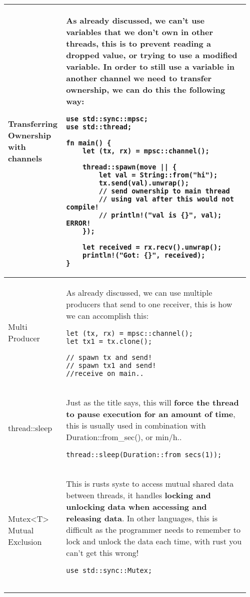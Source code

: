 \documentclass[main.tex,fontsize=8pt,paper=a4,paper=portrait,DIV=calc,]{scrartcl}
\begin{document}
\begin{table}[ht!]
\begin{tabular}{|m{0.2\linewidth}|m{0.755\linewidth}|}
\hline
Transferring Ownership with channels & 
As already discussed, we can't use variables that we don't own in other threads, this is to prevent reading a dropped value, or trying to use a modified variable.\newline
In order to still use a variable in another channel we need to \textbf{transfer ownership}, we can do this the following way:\newline
\begin{lstlisting}
use std::sync::mpsc;
use std::thread;

fn main() {
    let (tx, rx) = mpsc::channel();

    thread::spawn(move || {
        let val = String::from("hi");
        tx.send(val).unwrap();
        // send ownership to main thread
        // using val after this would not compile!
        // println!("val is {}", val); ERROR!
    });

    let received = rx.recv().unwrap();
    println!("Got: {}", received);
}
\end{lstlisting}\\
\hline
Multi Producer & 
As already discussed, we can use multiple producers that send to one receiver, this is how we can accomplish this:\newline
\begin{lstlisting}
let (tx, rx) = mpsc::channel();
let tx1 = tx.clone();

// spawn tx and send!
// spawn tx1 and send!
//receive on main..
\end{lstlisting}\\
\hline
thread::sleep & 
Just as the title says, this will \textbf{force the thread to pause execution for an amount of time},\newline
this is usually used in combination with Duration::from\_sec(), or min/h..\newline
\begin{lstlisting}
thread::sleep(Duration::from_secs(1));
\end{lstlisting}\\
\hline
Mutex<T> Mutual Exclusion & 
This is rusts syste to access mutual shared data between threads, it handles \textbf{locking and unlocking data when accessing and releasing data}. \newline
In other languages, this is difficult as the programmer needs to remember to lock and unlock the data each time, with rust you can't get this wrong!\newline
\begin{lstlisting}
use std::sync::Mutex;


\end{lstlisting}
\end{tabular}
\end{table}
\end{document}
